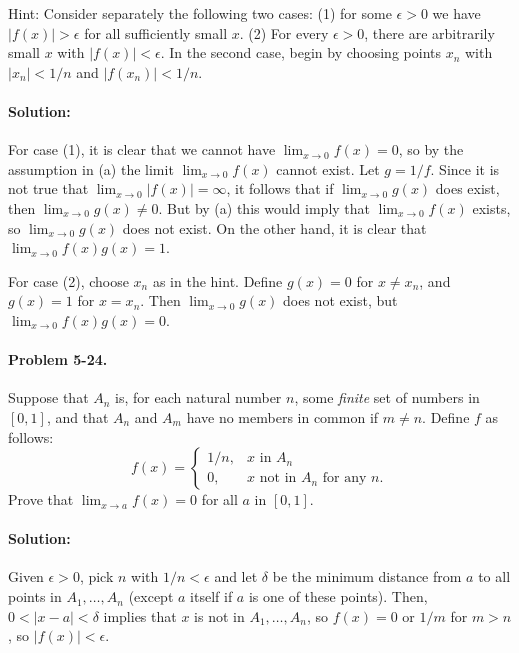 \documentclass{article}
\begin{document}
Hint: Consider separately the following two cases: (1) for some $\epsilon > 0$
we have $|f(x)| > \epsilon$ for all sufficiently small $x$. (2) For every
$\epsilon > 0$, there are arbitrarily small $x$ with $|f(x)| < \epsilon$. In
the second case, begin by choosing points $x_n$ with $|x_n| < 1/n$ and
$|f(x_n)| < 1/n$.

\paragraph{Solution:} For case (1), it is clear that we cannot have
$\lim_{x \rightarrow 0}f(x) = 0$, so by the assumption in (a) the limit
$\lim_{x \rightarrow 0}f(x)$ cannot exist. Let $g = 1/f$. Since it is not true
that $\lim_{x \rightarrow 0}|f(x)| = \infty$, it follows that if $\lim_{x
\rightarrow 0}g(x)$ does exist, then $\lim_{x \rightarrow 0}g(x) \neq 0$. But
by (a) this would imply that $\lim_{x \rightarrow 0}f(x)$ exists, so $\lim_{x
\rightarrow 0}g(x)$ does not exist. On the other hand, it is clear that
$\lim_{x \rightarrow 0}f(x)g(x) = 1$.

For case (2), choose $x_n$ as in the hint. Define $g(x) = 0$ for $x \neq x_n$,
and $g(x) = 1$ for $x = x_n$. Then $\lim_{x \rightarrow 0}g(x)$ does not exist,
but $\lim_{x \rightarrow 0}f(x)g(x) = 0$.

\paragraph{Problem 5-24.} Suppose that $A_n$ is, for each natural number $n$,
some \emph{finite} set of numbers in $[0, 1]$, and that $A_n$ and $A_m$ have no
members in common if $m \neq n$. Define $f$ as follows: \begin{equation*}
  f(x) = \begin{cases}
    1/n, &x \text{ in } A_n \\
    0, &x \text{ not in } A_n \text{ for any } n.
  \end{cases}
\end{equation*}
Prove that $\lim_{x \rightarrow a}f(x) = 0$ for all $a$ in $[0, 1]$.

\paragraph{Solution:} Given $\epsilon > 0$, pick $n$ with $1/n < \epsilon$ and
let $\delta$ be the minimum distance from $a$ to all points in $A_1, \ldots,
A_n$ (except $a$ itself if $a$ is one of these points). Then, $0 < |x - a| <
\delta$ implies that $x$ is not in $A_1, \ldots, A_n$, so $f(x) = 0$ or $1/m$
for $m > n$, so $|f(x)| < \epsilon$.
\end{document}

